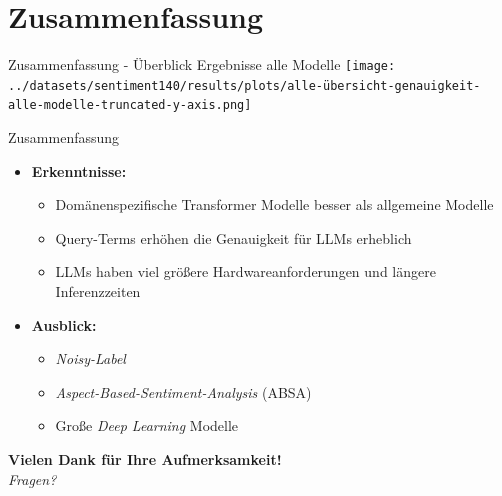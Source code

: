 \documentclass[aspectratio=169]{beamer} %
\begin{document}
\section{Zusammenfassung}

\begin{frame}{Zusammenfassung - Überblick Ergebnisse alle Modelle}
    \centering
    \texttt{[image: ../datasets/sentiment140/results/plots/alle-übersicht-genauigkeit-alle-modelle-truncated-y-axis.png]}
\end{frame}

\begin{frame}{Zusammenfassung}
  \normalsize
      \begin{itemize}
        \item \textbf{Erkenntnisse:}
        \begin{itemize}
            \item Domänenspezifische Transformer Modelle besser als allgemeine Modelle
            \item Query-Terms erhöhen die Genauigkeit für LLMs erheblich
            \item LLMs haben viel größere Hardwareanforderungen und längere Inferenzzeiten
        \end{itemize}
        \vspace{0.4cm}
        \item \textbf{Ausblick:}
        \begin{itemize}
            \item \textit{Noisy-Label}
            \item \textit{Aspect-Based-Sentiment-Analysis} (ABSA)
            \item Große \textit{Deep Learning} Modelle
        \end{itemize}
    \end{itemize}

  \vspace{0.5cm}
  \centering
  \pause
  {\large \textbf{Vielen Dank für Ihre Aufmerksamkeit!}} \\[0.1cm]
  \textit{Fragen?}
\end{frame}
\end{document}
